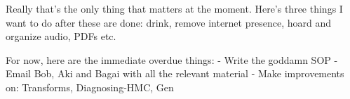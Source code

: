 \noindent {}

Really that's the only thing that matters at the moment. Here's three things I want to do after these are done: drink, remove internet presence, hoard and organize audio, PDFs etc.

For now, here are the immediate overdue things:
- Write the goddamn SOP
- Email Bob, Aki and Bagai with all the relevant material
- Make improvements on: Transforms, Diagnosing-HMC, Gen